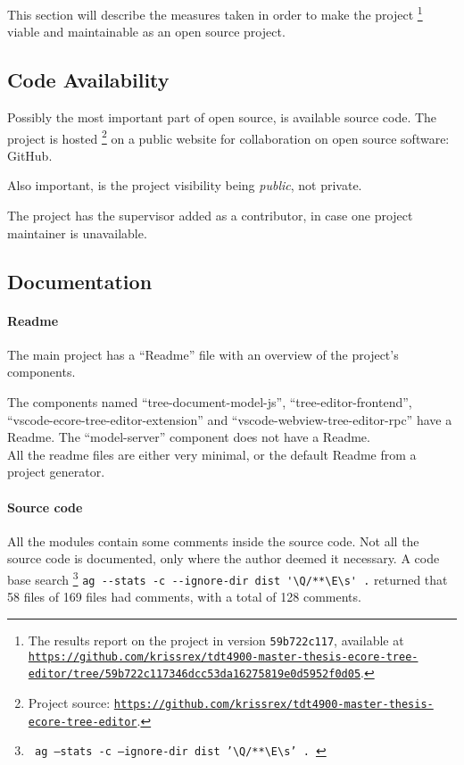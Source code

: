 
This section will describe the measures taken in order to make the project%
\footnote{The results report on the project in version \texttt{59b722c117}, available at \href{https://github.com/krissrex/tdt4900-master-thesis-ecore-tree-editor/tree/59b722c117346dcc53da16275819e0d5952f0d05}{\nolinkurl{https://github.com/krissrex/tdt4900-master-thesis-ecore-tree-editor/tree/59b722c117346dcc53da16275819e0d5952f0d05}}.}
viable and maintainable as an \gls{open source} project.

\subsection{Code Availability}

Possibly the most important part of \gls{open source}, is available source code.
The project is hosted%
\footnote{Project source: \href{https://github.com/krissrex/tdt4900-master-thesis-ecore-tree-editor}{\nolinkurl{https://github.com/krissrex/tdt4900-master-thesis-ecore-tree-editor}}.}
on a public website for collaboration on \gls{open source} software: \gls{GitHub}.

Also important, is the project visibility being \textit{public}, not private.

The project has the supervisor added as a contributor, in case one project maintainer is unavailable.

\subsection{Documentation}

\paragraph{Readme}
The main project has a ``Readme'' file with an overview of the project's components.

The components named ``tree-document-model-js'', ``tree-editor-frontend'', ``vscode-ecore-tree-editor-extension'' and ``vscode-webview-tree-editor-rpc'' have a Readme.
The ``model-server'' component does not have a Readme.\\

All the readme files are either very minimal, or the default Readme from a project generator.


\paragraph{Source code}
All the modules contain some comments inside the source code.
Not all the source code is documented, only where the author deemed it necessary.
A code base search%
\footnote{
\texttt{
ag --stats -c --ignore-dir dist '\textbackslash{}Q/**\textbackslash{}E\textbackslash{}s' .
}}
\lstinline{ag --stats -c --ignore-dir dist '\Q/**\E\s' .}
returned that 58 files of 169 files had comments, with a total of 128 comments.

